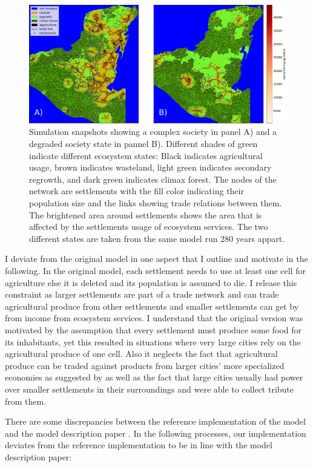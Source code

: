 \begin{figure}[!t]
\centering
\includegraphics[width=\textwidth]{figures/map_plots.pdf}
\caption{Simulation snapshots showing a complex society in panel A) and a degraded society state in pannel B). Different shades of green indicate different ecosystem states: Black indicates agricultural usage, brown indicates wasteland, light green indicates secondary regrowth, and dark green indicates climax forest. The nodes of the network are settlements with the fill color indicating their population size and the links showing trade relations between them. The brightened area around settlements shows the area that is affected by the settlements usage of ecosystem services. The two different states are taken from the same model run 280 years appart.}
\label{fig:model_snapshot}
\end{figure}

I deviate from the original model in one aspect that I outline and motivate in the following.
In the original model, each settlement needs to use at least one cell for agriculture else it is deleted and its population is assumed to die. I release this constraint as larger settlements are part of a trade network and can trade agricultural produce from other settlements and smaller settlements can get by from income from ecosystem services. I understand that the original version was motivated by the assumption that every settlement must produce some food for its inhabitants, yet this resulted in situations where very large cities rely on the agricultural produce of one cell. Also it neglects the fact that agricultural produce can be traded against products from larger cities' more specialized economies as suggested by \cite{Dahlin2007} as well as the fact that large cities usually had power over smaller settlements in their surroundings and were able to collect tribute from them.

There are some discrepancies between the reference implementation of the model \cite{Heckbert2013model} and the model description paper \cite{Heckbert2013}. In the following processes, our implementation deviates from the reference implementation to be in line with the model description paper: 

